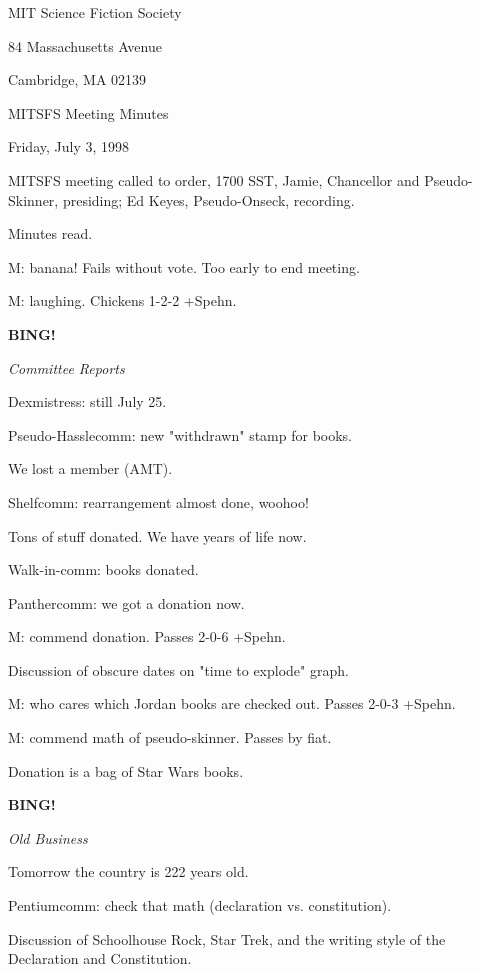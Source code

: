 \documentclass[12pt]{article}
\newcommand{\bing}{{\bf BING!} }
\newcommand{\goto}[1]{\bing \vskip 12pt \centerline{{\em{#1}}}}
\begin{document}
\begin{center}

MIT Science Fiction Society 

84 Massachusetts Avenue

Cambridge, MA 02139

\vspace{12pt}

MITSFS Meeting Minutes 

Friday, July 3, 1998

\end{center}
 
\vspace{18pt}

\setlength{\parskip}{6pt}

\noindent
MITSFS meeting called to order, 1700 SST,
Jamie, Chancellor and Pseudo-Skinner, presiding; Ed Keyes, Pseudo-Onseck, recording.

Minutes read.

M: banana! Fails without vote. Too early to end meeting.

M: laughing. Chickens 1-2-2 +Spehn.

\goto{Committee Reports}

Dexmistress: still July 25.

Pseudo-Hasslecomm: new "withdrawn" stamp for books.

We lost a member (AMT).

Shelfcomm: rearrangement almost done, woohoo!

Tons of stuff donated. We have years of life now.

Walk-in-comm: books donated.

Panthercomm: we got a donation now.

M: commend donation. Passes 2-0-6 +Spehn.

Discussion of obscure dates on "time to explode" graph.

M: who cares which Jordan books are checked out. Passes 2-0-3 +Spehn.

M: commend math of pseudo-skinner. Passes by fiat.

Donation is a bag of Star Wars books.

\goto{Old Business}

Tomorrow the country is 222 years old.

Pentiumcomm: check that math (declaration vs. constitution).

Discussion of Schoolhouse Rock, Star Trek, and the writing style of the Declaration and Constitution.
\end{document}
